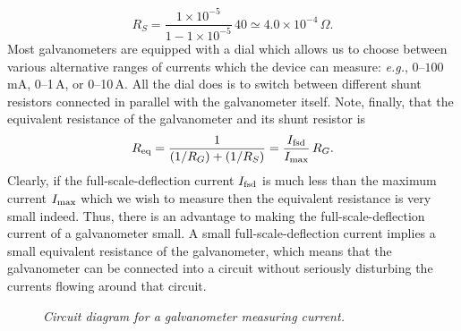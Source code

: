 \begin{equation}
R_S = \frac{ 1\times 10^{-5}}{1 - 1\times 10^{-5}} \,40 \simeq 4.0\times 10^{-4}
\,\Omega.
\end{equation}
Most galvanometers are equipped with a dial which allows us to choose between
various alternative  ranges of currents which the device can measure: {\em e.g.},
0--$100$\,mA, 0--1\,A, or 0--10\,A. All the dial does is to switch
between  different
shunt resistors connected in parallel with the galvanometer itself. 
Note, finally, that the equivalent resistance of the galvanometer and its
shunt resistor is
\begin{equation}
R_{\rm eq} = \frac{1}{(1/R_G)+(1/R_S)} = \frac{I_{\rm fsd}}{I_{\rm max}}\,R_G.
\end{equation}
Clearly, if the full-scale-deflection current $I_{\rm fsd}$ is much less than the maximum current $I_{\rm max}$
which we wish to measure then the equivalent resistance is very small indeed. 
Thus, there is an advantage to making the full-scale-deflection current
of a galvanometer small. A small full-scale-deflection current implies a
small equivalent resistance of the galvanometer, which means that the
galvanometer can be connected into a circuit without seriously disturbing the
currents flowing around that
circuit. 

\begin{figure}[h]
\epsfysize=2in
\centerline{}
\caption{\em Circuit diagram for a galvanometer measuring current.}\label{f8.13}
\end{figure}

